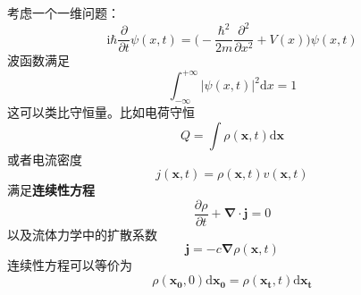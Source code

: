 \documentclass[12pt]{article}
\begin{document}
    考虑一个一维问题：
    \begin{equation}
        \mathrm{i}\hbar \frac {\partial}{\partial t} \psi(x,t) = \bigg(-\frac {\hbar^2}{2m} \frac {\partial ^2}{\partial x^2} + V(x)\bigg)\psi(x,t)
    \end{equation}
    波函数满足
    \begin{equation}
        \int_{-\infty}^{+\infty} |\psi(x,t)|^2 \mathrm{d}x = 1
    \end{equation}
    这可以类比守恒量。比如电荷守恒
    \begin{equation}
        Q = \int \rho(\bm{x},t) \mathrm{d}\bm{x}
    \end{equation}
    或者电流密度
    \begin{equation}
        j(\bm{x},t) = \rho(\bm{x},t)v(\bm{x},t)
    \end{equation}
    满足\textbf{连续性方程}
    \begin{equation}
        \frac{\partial \rho}{\partial t} + \bm{\nabla} \cdot \bm{j} = 0
    \end{equation}
    以及流体力学中的扩散系数
    \begin{equation}
        \bm{j} = -c \bm{\nabla}\rho(\bm{x},t)
    \end{equation}
    连续性方程可以等价为
    \begin{equation}
        \rho(\bm{x_0},0)\mathrm{d}\bm{x_0} = \rho(\bm{x_t},t)\mathrm{d}\bm{x_t} 
    \end{equation}
\end{document}
